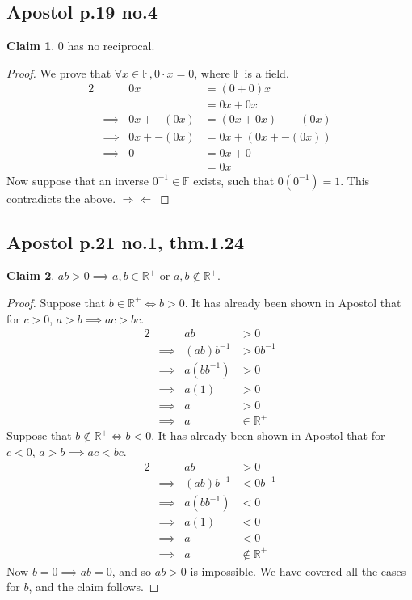 \documentclass[12pt,letterpaper]{article}
\theoremstyle{definition}
\newtheorem*{claim}{Claim}
\newcommand{\contra}{\Rightarrow\!\Leftarrow}
\newcommand{\R}{\mathbb{R}}
\newcommand{\F}{\mathbb{F}}
\begin{document}
\subsection*{Apostol p.19 no.4}
\begin{claim}
    $0$ has no reciprocal.
\end{claim}

\begin{proof}
    We prove that $\forall x \in \F, 0 \cdot x = 0$, where $\F$ is a field.
    \begin{alignat*}{2}
        &&0x &= (0 + 0)x \\
        && &= 0x + 0x \\
        &\implies& 0x + -(0x) &= (0x + 0x) + -(0x) \\
        &\implies& 0x + -(0x) &= 0x + (0x + -(0x)) \\
        &\implies& 0 &= 0x + 0 \\
        && &= 0x
    \end{alignat*}
    Now suppose that an inverse $0^{-1} \in \F$ exists, such that $0(0^{-1}) = 1$.
    This contradicts the above. $\contra$
\end{proof}

\subsection*{Apostol p.21 no.1, thm.1.24}

\begin{claim}
    $ab > 0 \implies a,b \in \R^+$ or $a,b \notin \R^+$.
\end{claim}

\begin{proof}
    Suppose that $b \in \R^+ \iff b > 0$.
    It has already been shown in Apostol that for $c > 0$, $a > b \implies ac > bc$.
    \begin{alignat*}{2}
        && ab &> 0 \\
        &\implies& (ab)b^{-1} &> 0b^{-1} \\
        &\implies& a(bb^{-1}) &> 0 \\
        &\implies& a(1) &> 0 \\
        &\implies& a &> 0 \\
        &\implies& a &\in \R^+
    \end{alignat*}
    Suppose that $b \notin \R^+ \iff b < 0$.
    It has already been shown in Apostol that for $c < 0$, $a > b \implies ac < bc$.
    \begin{alignat*}{2}
        && ab &> 0 \\
        &\implies& (ab)b^{-1} &< 0b^{-1} \\
        &\implies& a(bb^{-1}) &< 0 \\
        &\implies& a(1) &< 0 \\
        &\implies& a &< 0 \\
        &\implies& a &\notin \R^+
    \end{alignat*}
    Now $b = 0 \implies ab = 0$, and so $ab > 0$ is impossible. 
    We have covered all the cases for $b$, and the claim follows.
\end{proof}
\end{document}
